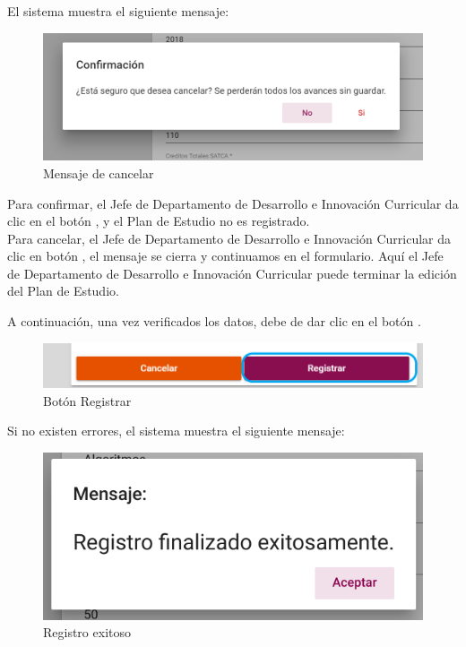 El sistema muestra el siguiente mensaje:
\begin{figure}[!hbtp]
	\centering
	\hypertarget{ms1}{\includegraphics[width=0.7\linewidth]{images/SP4-GPE/m1}}
	\caption{Mensaje de cancelar}
	\label{ms1}
\end{figure}

Para confirmar,  el Jefe de Departamento de Desarrollo e Innovación Curricular da clic en el botón  , y el Plan de Estudio no es registrado.\\

Para cancelar, el Jefe de Departamento de Desarrollo e Innovación Curricular da clic en botón  , el mensaje se cierra y continuamos en el formulario. Aquí el Jefe de Departamento de Desarrollo e Innovación Curricular puede terminar la edición del Plan de Estudio.

A continuación, una vez verificados los datos, debe de dar clic en el botón .
\begin{figure}[!hbtp]
	\centering
	\hypertarget{btnreg}{\includegraphics[width=0.7\linewidth]{images/SP4-GPE/registrarB}}
	\caption{Botón Registrar}
	\label{btnreg}
\end{figure}

Si no existen errores, el sistema muestra el siguiente mensaje:
	\begin{figure}[!hbtp]
	\centering
	\hypertarget{exito}{\includegraphics[width=0.7\linewidth]{images/SP4-GPE/exito}}
	\caption{Registro exitoso}
	\label{exito}
\end{figure}

